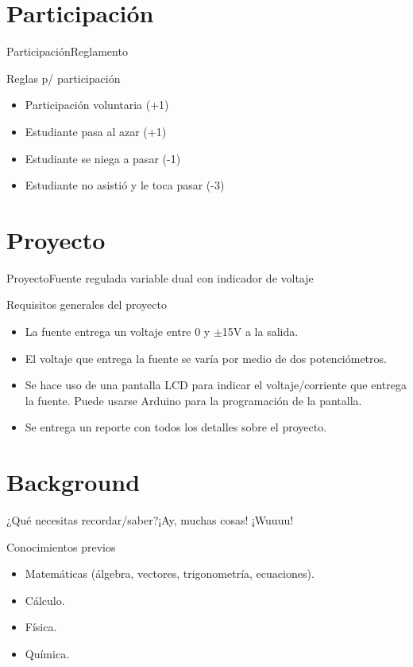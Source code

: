 \documentclass[10pt]{beamer}
\begin{document}
\section{Participación}
\begin{frame}{Participación}{Reglamento}
\begin{block}{Reglas p/ participación}
    \begin{itemize}
        \item Participación voluntaria (+1)
        \item Estudiante pasa al azar (+1)
        \item Estudiante se niega a pasar (-1)
        \item Estudiante no asistió y le toca pasar (-3)
    \end{itemize}
\end{block}

\end{frame}

\section{Proyecto}
\begin{frame}{Proyecto}{Fuente regulada variable dual con indicador de voltaje}
\begin{block}{Requisitos generales del proyecto}
    \begin{itemize}
        \item La fuente entrega un voltaje entre 0 y $\pm$15V a la salida.
        \item El voltaje que entrega la fuente se varía por medio de dos potenciómetros. 
        \item Se hace uso de una pantalla LCD para indicar el voltaje/corriente que entrega la fuente. Puede usarse Arduino para la programación de la pantalla.
        \item Se entrega un reporte con todos los detalles sobre el proyecto.
    \end{itemize}
\end{block}

\end{frame}

\section{Background}
\begin{frame}{¿Qué necesitas recordar/saber?}{¡Ay, muchas cosas! ¡Wuuuu!}
\begin{block}{Conocimientos previos}
    \begin{itemize}
        \item Matemáticas (álgebra, vectores, trigonometría, ecuaciones).
        \item Cálculo.
        \item Física.
        \item Química.
    \end{itemize}
\end{block}

\end{frame}
\end{document}
